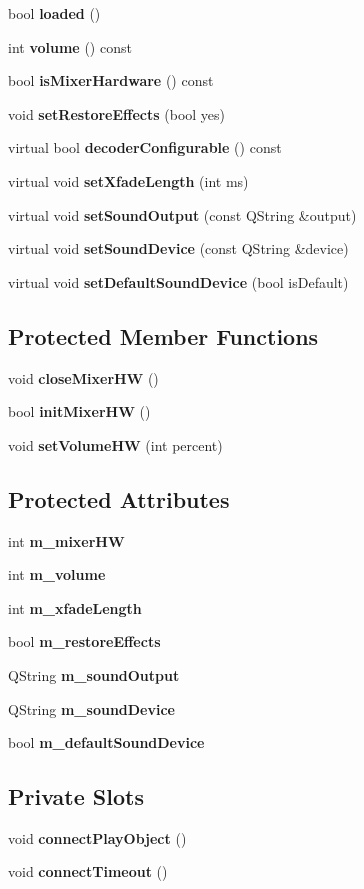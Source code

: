 \begin{CompactItemize}
bool {\bf loaded} ()
\item 
int {\bf volume} () const 
\item 
bool {\bf is\-Mixer\-Hardware} () const 
\item 
void {\bf set\-Restore\-Effects} (bool yes)
\item 
virtual bool {\bf decoder\-Configurable} () const 
\item 
virtual void {\bf set\-Xfade\-Length} (int ms)
\item 
virtual void {\bf set\-Sound\-Output} (const QString \&output)
\item 
virtual void {\bf set\-Sound\-Device} (const QString \&device)
\item 
virtual void {\bf set\-Default\-Sound\-Device} (bool is\-Default)
\end{CompactItemize}
\subsection*{Protected Member Functions}
\begin{CompactItemize}
\item 
void {\bf close\-Mixer\-HW} ()
\item 
bool {\bf init\-Mixer\-HW} ()
\item 
void {\bf set\-Volume\-HW} (int percent)
\end{CompactItemize}
\subsection*{Protected Attributes}
\begin{CompactItemize}
\item 
int {\bf m\_\-mixer\-HW}
\item 
int {\bf m\_\-volume}
\item 
int {\bf m\_\-xfade\-Length}
\item 
bool {\bf m\_\-restore\-Effects}
\item 
QString {\bf m\_\-sound\-Output}
\item 
QString {\bf m\_\-sound\-Device}
\item 
bool {\bf m\_\-default\-Sound\-Device}
\end{CompactItemize}
\subsection*{Private Slots}
\begin{CompactItemize}
\item 
void {\bf connect\-Play\-Object} ()
\item 
void {\bf connect\-Timeout} ()
\end{CompactItemize}
